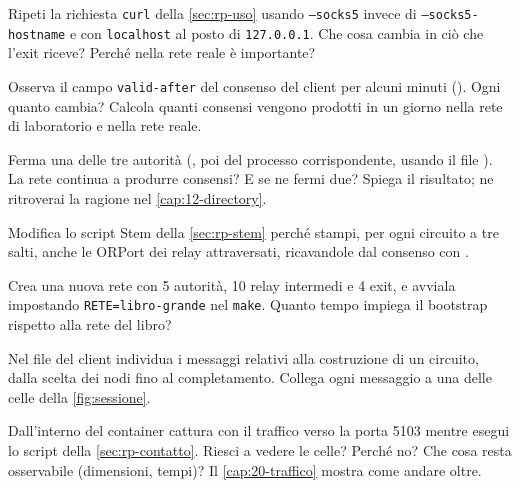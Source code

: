 \begin{esercizio}[1]\label{es:19-socks}
Ripeti la richiesta \texttt{curl} della \cref{sec:rp-uso} usando \texttt{--socks5} invece di \texttt{--socks5-hostname} e con \texttt{localhost} al posto di \texttt{127.0.0.1}. Che cosa cambia in ciò che l'exit riceve? Perché nella rete reale è importante?
\end{esercizio}

\begin{esercizio}[2]\label{es:19-consenso}
Osserva il campo \texttt{valid-after} del consenso del client per alcuni minuti (). Ogni quanto cambia? Calcola quanti consensi vengono prodotti in un giorno nella rete di laboratorio e nella rete reale.
\end{esercizio}

\begin{esercizio}[2]\label{es:19-autorita}
Ferma una delle tre autorità (, poi  del processo corrispondente, usando il file ). La rete continua a produrre consensi? E se ne fermi due? Spiega il risultato; ne ritroverai la ragione nel \cref{cap:12-directory}.
\end{esercizio}

\begin{esercizio}[2]\label{es:19-stem}
Modifica lo script Stem della \cref{sec:rp-stem} perché stampi, per ogni circuito a tre salti, anche le ORPort dei relay attraversati, ricavandole dal consenso con .
\end{esercizio}

\begin{esercizio}[2]\label{es:19-rete}
Crea una nuova rete  con 5 autorità, 10 relay intermedi e 4 exit, e avviala impostando \texttt{RETE=libro-grande} nel \texttt{make}. Quanto tempo impiega il bootstrap rispetto alla rete del libro?
\end{esercizio}

\begin{esercizio}[3]\label{es:19-log}
Nel file  del client individua i messaggi relativi alla costruzione di un circuito, dalla scelta dei nodi fino al completamento. Collega ogni messaggio a una delle celle della \cref{fig:sessione}.
\end{esercizio}

\begin{esercizio}[3]\label{es:19-cattura}
Dall'interno del container cattura con  il traffico verso la porta 5103 mentre esegui lo script della \cref{sec:rp-contatto}. Riesci a vedere le celle? Perché no? Che cosa resta osservabile (dimensioni, tempi)? Il \cref{cap:20-traffico} mostra come andare oltre.
\end{esercizio}

